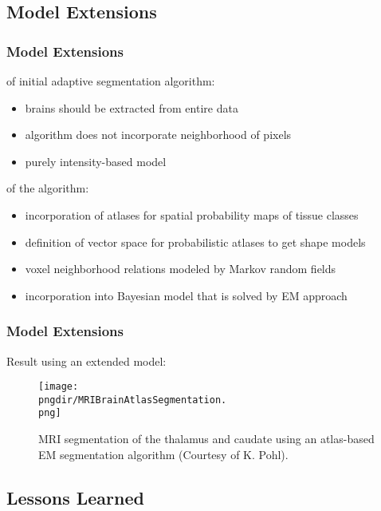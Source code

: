 \subsection{Model Extensions}

\begin{frame}
  \frametitle{Model Extensions}

   of initial adaptive segmentation algorithm:

  \begin{itemize}
    \item brains should be extracted from entire data \pause
    \item algorithm does not incorporate neighborhood of pixels \pause
    \item purely intensity-based model
  \end{itemize}
  \pspread

   of the algorithm:

  \begin{itemize}
    \item incorporation of atlases for spatial probability maps of tissue classes \pause
    \item definition of vector space for probabilistic atlases to get shape models \pause
    \item voxel neighborhood relations modeled by Markov random fields \pause
    \item incorporation into Bayesian model that is solved by EM approach
  \end{itemize}
\end{frame}


\begin{frame}
  \frametitle{Model Extensions \cont}

  Result using an extended model:

  \begin{figure}
    \texttt{[image: \\pngdir/MRIBrainAtlasSegmentation.\\png]}
    \caption{\footnotesize MRI segmentation of the thalamus and caudate using an atlas-based EM segmentation algorithm (Courtesy of K. Pohl).}
  \end{figure}
\end{frame}


\subsection{Lessons Learned}

